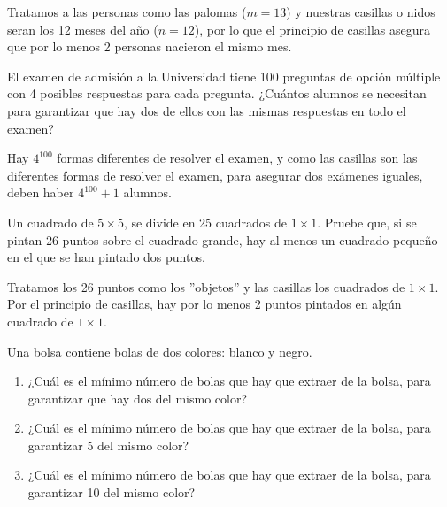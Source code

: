 \documentclass[12pt]{article}
\begin{document}
\begin{solucion}
    Tratamos a las personas como las palomas ($m=13$) y nuestras casillas o nidos seran los 12 meses del año ($n=12$), por lo que el principio de casillas asegura que por lo menos 2 personas nacieron el mismo mes.
\end{solucion}

\begin{ejemplo}
    El examen de admisión a la Universidad tiene 100 preguntas de opción múltiple con 4 posibles respuestas para cada pregunta. ¿Cuántos alumnos se necesitan para garantizar que hay dos de ellos con las mismas respuestas en todo el examen?
\end{ejemplo}

\begin{solucion}
    Hay $4^{100}$ formas diferentes de resolver el examen, y como las casillas son las diferentes formas de resolver el examen, para asegurar dos exámenes iguales, deben haber $4^{100}+1$ alumnos.
\end{solucion}

\begin{ejemplo}
    Un cuadrado de $5 \times 5$, se divide en 25 cuadrados de $1 \times 1$.  Pruebe que, si se pintan 26 puntos sobre el cuadrado grande, hay al menos un cuadrado pequeño en el que se han pintado dos puntos.
\end{ejemplo}

\begin{solucion}
    Tratamos los 26 puntos como los ''objetos'' y las casillas los cuadrados de $1 \times 1$.  Por el principio de casillas, hay por lo menos 2 puntos pintados en algún cuadrado de $1 \times 1$.
\end{solucion}

\begin{ejemplo}
    Una bolsa contiene bolas de dos colores:  blanco y negro.
    \renewcommand{\labelenumi}{\alph{enumi})}
    \begin{enumerate}
        \item ¿Cuál es el mínimo número de bolas que hay que extraer de la bolsa, para garantizar que hay dos del mismo color?
        \item ¿Cuál es el mínimo número de bolas que hay que extraer de la bolsa, para garantizar 5 del mismo color?
        \item ¿Cuál es el mínimo número de bolas que hay que extraer de la bolsa, para garantizar 10 del mismo color?
    \end{enumerate}
\end{ejemplo}
\end{document}
